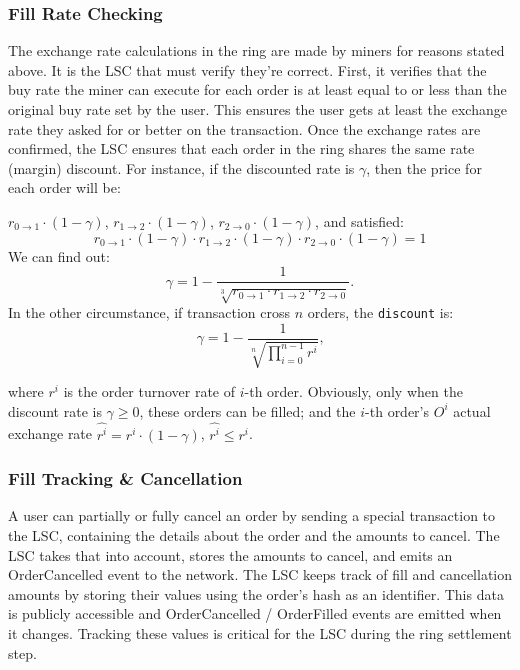 \documentclass[UTF8,nofonts]{article}
\begin{document}
\begin{multicols}{2}
\subsubsection{Fill Rate Checking\label{sec:fill_rate_check}}
The exchange rate calculations in the ring are made by miners for reasons stated above. It is the LSC that must verify they're correct. First, it verifies that the buy rate the miner can execute for each order is at least equal to or less than the original buy rate set by the user. This ensures the user gets at least the exchange rate they asked for or better on the transaction. Once the exchange rates are confirmed, the LSC ensures that each order in the ring shares the same rate (margin) discount. For instance, if the discounted rate is $\gamma$, then the price for each order will be:

$r_{0\rightarrow 1} \cdot (1-\gamma)$, $r_{1\rightarrow 2} \cdot (1-\gamma)$, $r_{2 \rightarrow 0} \cdot (1-\gamma)$, and satisfied: 
\begin{equation}
r_{0\rightarrow 1} \cdot (1-\gamma)\cdot r_{1\rightarrow 2} \cdot (1-\gamma) \cdot r_{2 \rightarrow 0} \cdot (1-\gamma) = 1
\end{equation}
We can find out: 
\begin{equation*}
\gamma = 1- \frac{1}{\sqrt[3]{r_{0\rightarrow 1} \cdot r_{1\rightarrow 2} \cdot r_{2\rightarrow 0}}}\text{.}
\end{equation*}
In the other circumstance, if transaction cross $n$ orders, the \texttt{discount} is: 
\begin{equation*}
\gamma = 1- \frac{1}{\sqrt[n]{\prod_{i=0}^{n-1} r^i}} \text{,}
\end{equation*}

where $r^i$ is the order turnover rate of $i$-th order. Obviously, only when the discount rate is $\gamma \ge 0$, these orders can be filled; and the $i$-th order's $O^i$ actual exchange rate $\hat{r^i} = r^i \cdot (1-\gamma)$, $\hat{r^i}\le r^i$.

\subsubsection{Fill Tracking \& Cancellation}
A user can partially or fully cancel an order by sending a special transaction to the LSC, containing the details about the order and the amounts to cancel. The LSC takes that into account, stores the amounts to cancel, and emits an OrderCancelled event to the network. The LSC keeps track of fill and cancellation amounts by storing their values using the order's hash as an identifier. This data is publicly accessible and OrderCancelled / OrderFilled events are emitted when it changes. Tracking these values is critical for the LSC during the ring settlement step.



\end{multicols}
\end{document}
